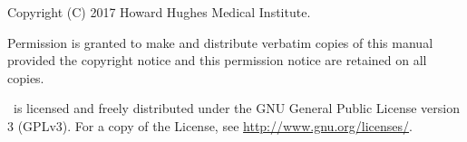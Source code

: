 \vspace*{\fill}
\begin{flushleft}
Copyright (C) 2017 Howard Hughes Medical Institute.\vspace{5mm}

\vspace{5mm}
Permission is granted to make and distribute verbatim copies of this
manual provided the copyright notice and this permission notice are
retained on all copies.\vspace{5mm}

\vspace{5mm} \etwomsa\ is licensed and freely distributed under the GNU
General Public License version 3 (GPLv3). For a copy of the License,
see \url{http://www.gnu.org/licenses/}.

\vspace{5mm}
\end{flushleft}



